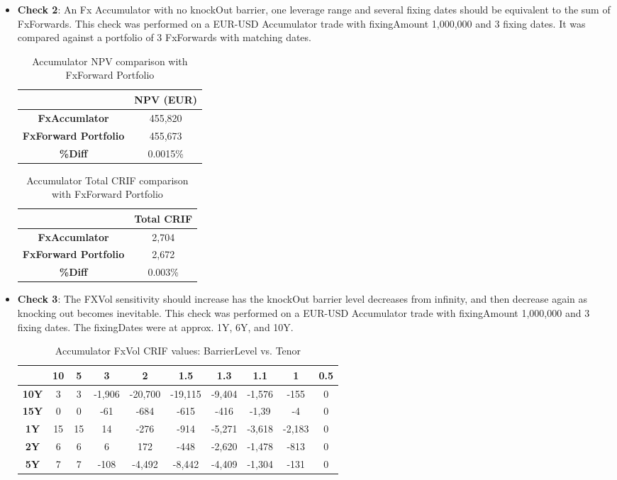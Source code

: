 \begin{itemize}
\item \textbf{Check 2}:  An Fx Accumulator with no knockOut barrier, one leverage range and several fixing dates should be equivalent to the sum of FxForwards.
This check was performed on a EUR-USD Accumulator trade with fixingAmount 1,000,000 and 3 fixing dates. It was compared against a portfolio of 3 FxForwards with matching dates.

\begin{table}[H]
\centering
  \begin{tabular}{|c|c|}
    \hline
  & \bfseries{NPV (EUR)}  \\
    \hline
  \bfseries{FxAccumlator} & 455,820 \\
  \bfseries{FxForward Portfolio} & 455,673 \\
  \bfseries{\%Diff} & 0.0015\% \\ 
  \hline
  \end{tabular}
  \caption{Accumulator NPV comparison with FxForward Portfolio}
\end{table}

\begin{table}[H]
\centering
  \begin{tabular}{|c|c|}
    \hline
  & \bfseries{Total CRIF}  \\
    \hline
  \bfseries{FxAccumlator} & 2,704 \\
  \bfseries{FxForward Portfolio} &  2,672\\
  \bfseries{\%Diff} & 0.003\% \\ 
  \hline
  \end{tabular}
  \caption{Accumulator Total CRIF comparison with FxForward Portfolio}
\end{table}

\item \textbf{Check 3}: The FXVol sensitivity should increase has the knockOut barrier level decreases from infinity, and then decrease again as knocking out becomes inevitable.
This check was performed on a EUR-USD Accumulator trade with fixingAmount 1,000,000 and 3 fixing dates. The fixingDates were at approx. 1Y, 6Y, and 10Y.

\begin{table}[H]
\centering
  \begin{tabular}{|c|c|c| c|c|c| c|c|c|c|}
    \hline
  & \bfseries{10}  & 5 & 3 & 2 & 1.5 & 1.3 & 1.1 & 1 & 0.5\\
    \hline
  \bfseries{10Y} & 3 & 3 & -1,906 & -20,700 & -19,115 & -9,404 & -1,576 & -155 & 0\\
  \bfseries{15Y} & 0 & 0 & -61 & -684 & -615 & -416 & -1,39 & -4 & 0\\
  \bfseries{1Y} & 15 & 15 & 14 & -276 & -914 & -5,271 & -3,618 & -2,183 & 0\\
  \bfseries{2Y} & 6 & 6 & 6 & 172 & -448 & -2,620 & -1,478 & -813 & 0\\
  \bfseries{5Y} & 7 & 7 & -108 & -4,492 & -8,442 & -4,409 & -1,304 & -131 & 0\\
  \hline
  \end{tabular}
  \caption{Accumulator FxVol CRIF values: BarrierLevel vs. Tenor}
\end{table}


\end{itemize}
